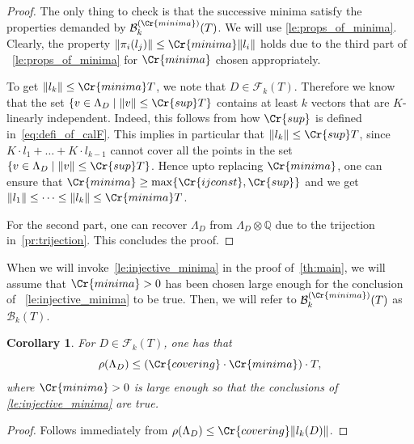 \documentclass{amsart}
\newtheorem{corollary}[theorem]{Corollary}
\theoremstyle{definition}
\theoremstyle{remark}
\begin{document}
\begin{proof}
    The only thing to check is that the successive minima satisfy the properties demanded by $\mathcal{B}_{k}^{(\Cr{minima})}(T)$.
    We will use \cref{le:props_of_minima}.
    Clearly, the property $\|\pi_{i}(l_{j}) \|\leq \Cr{minima} \|l_{i}\|$ holds due to the third part of ~\cref{le:props_of_minima} for $\Cr{minima}$ chosen appropriately. 

    To get $\|l_{k}\| \leq \Cr{minima} T$, we note that $D \in \mathcal{F}_{k}(T)$. Therefore we know that the set $\{v \in  \Lambda_{D} \mid \|v\| \leq \Cr{sup}T \}$ contains at least $k$ vectors that are $K$-linearly independent. Indeed, this follows from how $\Cr{sup}$ is defined in~\cref{eq:defi_of_calF}. This implies in particular that $\|l_{k}\| \leq \Cr{sup} T$, since $K \cdot l_{1} + \dots + K\cdot  l_{k-1}$ cannot cover all the points in the set $\{ v \in \Lambda_{D} \mid \|v\| \leq \Cr{sup} T \}$. 
    Hence upto replacing $\Cr{minima}$, one can ensure that $\Cr{minima} \geq \max\{\Cr{ijconst} ,\Cr{sup}\}$ and we get $\|l_{1}\| \leq \dots \leq \|l_{k}\| \leq  \Cr{minima} T$.


    For the second part, one can recover $\Lambda_{D}$ from $\Lambda_{D} \otimes \mathbb{Q}$ due to the trijection in~\cref{pr:trijection}. This concludes the proof.
\end{proof}


When we will invoke~\cref{le:injective_minima} in the proof of~\cref{th:main}, we will assume that $\Cr{minima}>0$ has been chosen large enough for the conclusion of ~\cref{le:injective_minima} to be true. Then, we will refer to $\mathcal{B}_{k}^{(\Cr{minima})}(T)$ as $\mathcal{B}_{k}(T)$.

\begin{corollary}
    \label{co:covering_bound}
    For $D \in \mathcal{F}_{k}(T)$, one has that 
    \begin{equation}
        \rho(\Lambda_{D}) \leq (\Cr{covering} \cdot \Cr{minima} )\cdot T,
    \end{equation}
    where $\Cr{minima}>0$ is large enough so that the conclusions of \cref{le:injective_minima} are true.
\end{corollary}
\begin{proof}
    Follows immediately from $\rho(\Lambda_{D}) \leq \Cr{covering} \| l_{k}(D)\|$.
\end{proof}
\end{document}

